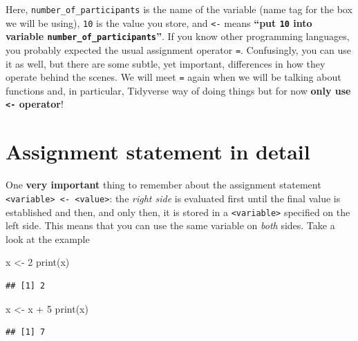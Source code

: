 \documentclass[
]{book}
\newenvironment{Shaded}{\begin{snugshade}}{\end{snugshade}}
\newcommand{\DecValTok}[1]{\textcolor[rgb]{0.00,0.00,0.81}{#1}}
\newcommand{\FunctionTok}[1]{\textcolor[rgb]{0.00,0.00,0.00}{#1}}
\newcommand{\NormalTok}[1]{#1}
\newcommand{\OtherTok}[1]{\textcolor[rgb]{0.56,0.35,0.01}{#1}}
\newcommand{\SpecialCharTok}[1]{\textcolor[rgb]{0.00,0.00,0.00}{#1}}
\begin{document}
Here, \texttt{number\_of\_participants} is the name of the variable (name tag for the box we will be using), \texttt{10} is the value you store, and \texttt{\textless{}-} means \textbf{``put \texttt{10} into variable \texttt{number\_of\_participants}''}. If you know other programming languages, you probably expected the usual assignment operator \texttt{=}. Confusingly, you can use it as well, but there are some subtle, yet important, differences in how they operate behind the scenes. We will meet \texttt{=} again when we will be talking about functions and, in particular, Tidyverse way of doing things but for now \textbf{only use \texttt{\textless{}-} operator}!

\hypertarget{assignment-statement-in-detail}{%
\section{Assignment statement in detail}\label{assignment-statement-in-detail}}

One \textbf{very important} thing to remember about the assignment statement \texttt{\textless{}variable\textgreater{}\ \textless{}-\ \textless{}value\textgreater{}}: the \emph{right side} is evaluated first until the final value is established and then, and only then, it is stored in a \texttt{\textless{}variable\textgreater{}} specified on the left side. This means that you can use the same variable on \emph{both} sides. Take a look at the example

\begin{Shaded}
\begin{Highlighting}[]
\NormalTok{x }\OtherTok{\textless{}{-}} \DecValTok{2}
\FunctionTok{print}\NormalTok{(x)}
\end{Highlighting}
\end{Shaded}

\begin{verbatim}
## [1] 2
\end{verbatim}

\begin{Shaded}
\begin{Highlighting}[]
\NormalTok{x }\OtherTok{\textless{}{-}}\NormalTok{ x }\SpecialCharTok{+} \DecValTok{5}
\FunctionTok{print}\NormalTok{(x)}
\end{Highlighting}
\end{Shaded}

\begin{verbatim}
## [1] 7
\end{verbatim}
\end{document}

